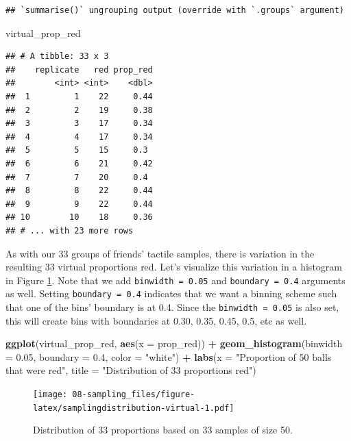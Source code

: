 \documentclass[
]{book}
\newenvironment{Shaded}{\begin{snugshade}}{\end{snugshade}}
\newcommand{\DataTypeTok}[1]{\textcolor[rgb]{0.13,0.29,0.53}{#1}}
\newcommand{\FloatTok}[1]{\textcolor[rgb]{0.00,0.00,0.81}{#1}}
\newcommand{\KeywordTok}[1]{\textcolor[rgb]{0.13,0.29,0.53}{\textbf{#1}}}
\newcommand{\NormalTok}[1]{#1}
\newcommand{\OperatorTok}[1]{\textcolor[rgb]{0.81,0.36,0.00}{\textbf{#1}}}
\newcommand{\StringTok}[1]{\textcolor[rgb]{0.31,0.60,0.02}{#1}}
\begin{document}
\begin{verbatim}
## `summarise()` ungrouping output (override with `.groups` argument)
\end{verbatim}

\begin{Shaded}
\begin{Highlighting}[]
\NormalTok{virtual_prop_red}
\end{Highlighting}
\end{Shaded}

\begin{verbatim}
## # A tibble: 33 x 3
##    replicate   red prop_red
##        <int> <int>    <dbl>
##  1         1    22     0.44
##  2         2    19     0.38
##  3         3    17     0.34
##  4         4    17     0.34
##  5         5    15     0.3 
##  6         6    21     0.42
##  7         7    20     0.4 
##  8         8    22     0.44
##  9         9    22     0.44
## 10        10    18     0.36
## # ... with 23 more rows
\end{verbatim}

As with our 33 groups of friends' tactile samples, there is variation in the resulting 33 virtual proportions red. Let's visualize this variation in a histogram in Figure \ref{fig:samplingdistribution-virtual}. Note that we add \texttt{binwidth\ =\ 0.05} and \texttt{boundary\ =\ 0.4} arguments as well. Setting \texttt{boundary\ =\ 0.4} indicates that we want a binning scheme such that one of the bins' boundary is at 0.4. Since the \texttt{binwidth\ =\ 0.05} is also set, this will create bins with boundaries at 0.30, 0.35, 0.45, 0.5, etc as well.

\begin{Shaded}
\begin{Highlighting}[]
\KeywordTok{ggplot}\NormalTok{(virtual_prop_red, }\KeywordTok{aes}\NormalTok{(}\DataTypeTok{x =}\NormalTok{ prop_red)) }\OperatorTok{+}
\StringTok{  }\KeywordTok{geom_histogram}\NormalTok{(}\DataTypeTok{binwidth =} \FloatTok{0.05}\NormalTok{, }\DataTypeTok{boundary =} \FloatTok{0.4}\NormalTok{, }\DataTypeTok{color =} \StringTok{"white"}\NormalTok{) }\OperatorTok{+}
\StringTok{  }\KeywordTok{labs}\NormalTok{(}\DataTypeTok{x =} \StringTok{"Proportion of 50 balls that were red"}\NormalTok{, }
       \DataTypeTok{title =} \StringTok{"Distribution of 33 proportions red"}\NormalTok{) }
\end{Highlighting}
\end{Shaded}

\begin{figure}
\centering
\texttt{[image: 08-sampling\_files/figure-latex/samplingdistribution-virtual-1.pdf]}
\caption{\label{fig:samplingdistribution-virtual}Distribution of 33 proportions based on 33 samples of size 50.}
\end{figure}
\end{document}
